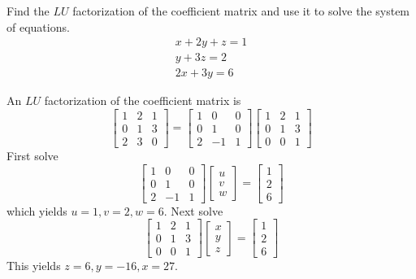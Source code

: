\documentclass{ximera}
\begin{document}
\begin{problem}\label{prb:4.71} Find the $LU$ factorization of the coefficient matrix and use it to solve the system of equations.
\begin{equation*}
\begin{array}{c}
x+2y+z=1 \\
y+3z=2 \\
2x+3y=6
\end{array}
\end{equation*}
\begin{hint}
An $LU$ factorization of the coefficient matrix is
\[
\left[
\begin{array}{rrr}
1 & 2 & 1 \\
0 & 1 & 3 \\
2 & 3 & 0
\end{array}
\right] = \left[
\begin{array}{rrr}
1 & 0 & 0 \\
0 & 1 & 0 \\
2 & -1 & 1
\end{array}
\right] \left[
\begin{array}{rrr}
1 & 2 & 1 \\
0 & 1 & 3 \\
0 & 0 & 1
\end{array}
\right]
\]
First solve
\[
 \left[
\begin{array}{rrr}
1 & 0 & 0 \\
0 & 1 & 0 \\
2 & -1 & 1
\end{array}
\right] \left[
\begin{array}{c}
u \\
v \\
w
\end{array}
\right] =\left[
\begin{array}{c}
1 \\
2 \\
6
\end{array}
\right]
\]
which yields $u=1,v=2,w=6$. Next solve
\[
\left[
\begin{array}{rrr}
1 & 2 & 1 \\
0 & 1 & 3 \\
0 & 0 & 1
\end{array}
\right] \left[
\begin{array}{c}
x \\
y \\
z
\end{array}
\right] =\left[
\begin{array}{c}
1 \\
2 \\
6
\end{array}
\right]
\]
This yields $z=6,y=-16,x=27.$
\end{hint}
\end{problem}
\end{document}
